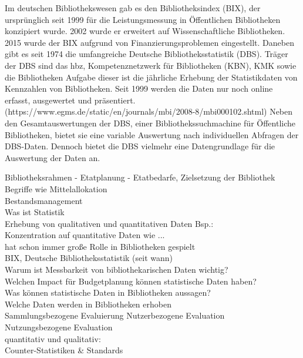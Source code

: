 Im deutschen Bibliothekswesen gab es den Bibliotheksindex (BIX), der ursprünglich seit 1999 für die Leistungsmessung in Öffentlichen Bibliotheken konzipiert wurde. 
2002 wurde er erweitert auf Wissenschaftliche Bibliotheken. 2015 wurde der BIX aufgrund von Finanzierungsproblemen eingestellt. 
Daneben gibt es seit 1974 die umfangreiche Deutsche Bibliotheksstatistik (DBS). Träger der DBS sind das hbz, Kompetenznetzwerk für Bibliotheken (KBN), KMK sowie die Bibliotheken
Aufgabe dieser ist die jährliche Erhebung der Statistikdaten von Kennzahlen von Bibliotheken. 
Seit 1999 werden die Daten nur noch online erfasst, ausgewertet und präsentiert. 
(https://www.egms.de/static/en/journals/mbi/2008-8/mbi000102.shtml)
Neben den Gesamtauswertungen der DBS, einer Bibliothekssuchmachine für Öffentliche Bibliotheken, bietet sie eine variable Auswertung nach individuellen Abfragen der DBS-Daten. Dennoch bietet die DBS vielmehr eine Datengrundlage für die Auswertung der Daten an.



\clearpage
Bibliotheksrahmen - Etatplanung - Etatbedarfe, Zielsetzung der Bibliothek\\
Begriffe wie Mittelallokation\\
Bestandsmanagement\\
Was ist Statistik\\
Erhebung von qualitativen und quantitativen Daten Bsp.:\\
Konzentration auf quantitative Daten wie ...\\
hat schon immer große Rolle in Bibliotheken gespielt\\
BIX, Deutsche Bibliotheksstatistik (seit wann)\\
Warum ist Messbarkeit von bibliothekarischen Daten wichtig?\\
Welchen Impact für Budgetplanung können statistische Daten haben?\\
Was können statistische Daten in Bibliotheken aussagen?\\
Welche Daten werden in Bibliotheken erhoben\\
Sammlungsbezogene Evaluierung
Nutzerbezogene Evaluation\\
Nutzungsbezogene Evaluation\\
quantitativ und qualitativ:\\
Counter-Statistiken \& Standards\\

\clearpage

